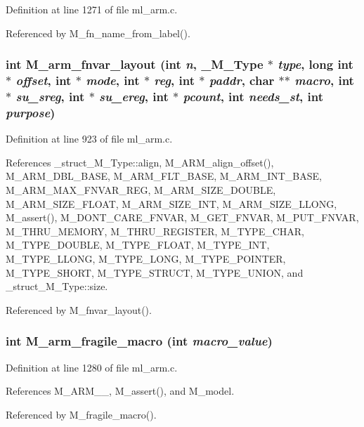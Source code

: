 Definition at line 1271 of file ml\_\-arm.c.

Referenced by M\_\-fn\_\-name\_\-from\_\-label().
\subsubsection{\setlength{\rightskip}{0pt plus 5cm}int M\_\-arm\_\-fnvar\_\-layout (int {\em n}, \bf{\_\-M\_\-Type} $\ast$ {\em type}, long int $\ast$ {\em offset}, int $\ast$ {\em mode}, int $\ast$ {\em reg}, int $\ast$ {\em paddr}, char $\ast$$\ast$ {\em macro}, int $\ast$ {\em su\_\-sreg}, int $\ast$ {\em su\_\-ereg}, int $\ast$ {\em pcount}, int {\em needs\_\-st}, int {\em purpose})}\label{ml__arm_8c_efbaf07f0b2622562e96d18a8ab6a38e}




Definition at line 923 of file ml\_\-arm.c.

References \_\-struct\_\-M\_\-Type::align, M\_\-ARM\_\-align\_\-offset(), M\_\-ARM\_\-DBL\_\-BASE, M\_\-ARM\_\-FLT\_\-BASE, M\_\-ARM\_\-INT\_\-BASE, M\_\-ARM\_\-MAX\_\-FNVAR\_\-REG, M\_\-ARM\_\-SIZE\_\-DOUBLE, M\_\-ARM\_\-SIZE\_\-FLOAT, M\_\-ARM\_\-SIZE\_\-INT, M\_\-ARM\_\-SIZE\_\-LLONG, M\_\-assert(), M\_\-DONT\_\-CARE\_\-FNVAR, M\_\-GET\_\-FNVAR, M\_\-PUT\_\-FNVAR, M\_\-THRU\_\-MEMORY, M\_\-THRU\_\-REGISTER, M\_\-TYPE\_\-CHAR, M\_\-TYPE\_\-DOUBLE, M\_\-TYPE\_\-FLOAT, M\_\-TYPE\_\-INT, M\_\-TYPE\_\-LLONG, M\_\-TYPE\_\-LONG, M\_\-TYPE\_\-POINTER, M\_\-TYPE\_\-SHORT, M\_\-TYPE\_\-STRUCT, M\_\-TYPE\_\-UNION, and \_\-struct\_\-M\_\-Type::size.

Referenced by M\_\-fnvar\_\-layout().
\subsubsection{\setlength{\rightskip}{0pt plus 5cm}int M\_\-arm\_\-fragile\_\-macro (int {\em macro\_\-value})}\label{ml__arm_8c_c68d55e338b499ec3e1f125d4d6de3b7}




Definition at line 1280 of file ml\_\-arm.c.

References M\_\-ARM\_\_, M\_\-assert(), and M\_\-model.

Referenced by M\_\-fragile\_\-macro().
